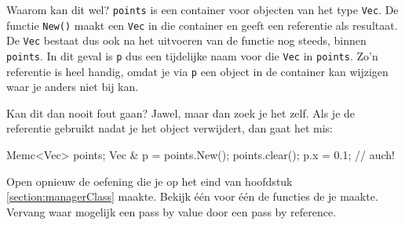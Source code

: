 Waarom kan dit wel? \texttt{points} is een container voor objecten van het type \texttt{Vec}. De functie \texttt{New()} maakt een \texttt{Vec} in die container en geeft een referentie als resultaat. De \texttt{Vec} bestaat dus ook na het uitvoeren van de functie nog steeds, binnen \texttt{points}. In dit geval is \texttt{p} dus een tijdelijke naam voor die \texttt{Vec} in \texttt{points}. Zo'n referentie is heel handig, omdat je via \texttt{p} een object in de container kan wijzigen waar je anders niet bij kan.

Kan dit dan nooit fout gaan? Jawel, maar dan zoek je het zelf. Als je de referentie gebruikt nadat je het object verwijdert, dan gaat het mis:

\begin{code}
Memc<Vec> points;
Vec & p = points.New();
points.clear();
p.x = 0.1; // auch!
\end{code}

\begin{exercise}
Open opnieuw de oefening die je op het eind van hoofdstuk \ref{section:managerClass} maakte. Bekijk \'e\'en voor \'e\'en de functies de je maakte. Vervang waar mogelijk een pass by value door een pass by reference.
\end{exercise}

